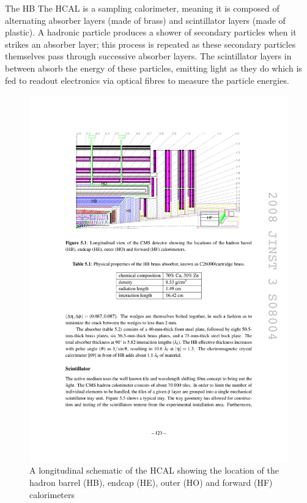 The HB
The HCAL is a sampling calorimeter, meaning it is composed of alternating absorber layers (made of brass) and
scintillator layers (made of plastic). A hadronic particle produces a shower of secondary particles when it
strikes an absorber layer; this process is repeated as these secondary particles themselves pass through
successive absorber layers. The scintillator layers in between absorb the energy of these particles, emitting
light as they do which is fed to readout electronics via optical fibres to measure the particle energies. 



\begin{figure}[hbtp]
   \centering
     \includegraphics[width=\textwidth]{Chapters/02_Detector/Images/HCAL.pdf}\hfill
     \caption{A longitudinal schematic of the HCAL showing the location of the hadron barrel (HB), endcap
     (HE), outer (HO) and forward (HF) calorimeters \cite{CMS_experiment}}
     \label{fig:CMS_HCAL}
\end{figure} 

